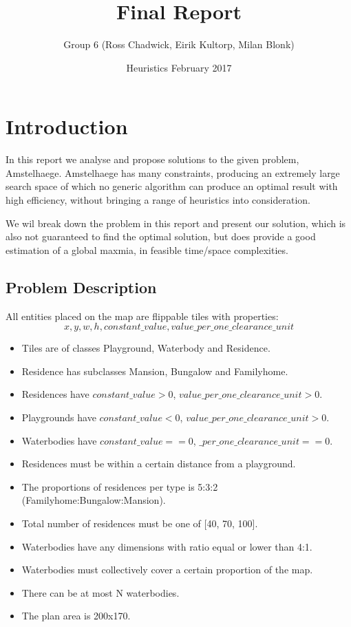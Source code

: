 \documentclass{article}
\title{Final Report}
\author{ Group 6 (Ross Chadwick, Eirik Kultorp, Milan Blonk) }
\date{Heuristics February 2017}
\begin{document}
\maketitle

\section{Introduction}

In this report we analyse and propose solutions to the given problem, Amstelhaege. Amstelhaege has many constraints, producing an extremely large search space of which no generic algorithm can produce an optimal result with high efficiency, without bringing a range of heuristics into consideration.

We wil break down the problem in this report and present our solution, which is also not guaranteed to find the optimal solution, but does provide a good estimation of a global maxmia, in feasible time/space complexities.

\subsection{Problem Description}

All entities placed on the map are flippable tiles with properties: \begin{equation}
{ x, y, w, h, constant\_value, value\_per\_one\_clearance\_unit }
\end{equation}

\begin{itemize}
\item Tiles are of classes Playground, Waterbody and Residence.
\item Residence has subclasses Mansion, Bungalow and Familyhome.
\item Residences have $constant\_value > 0$, $value\_per\_one\_clearance\_unit > 0$.
\item Playgrounds have $constant\_value < 0$, $value\_per\_one\_clearance\_unit > 0$.
\item Waterbodies have $constant\_value == 0$, $\_per\_one\_clearance\_unit == 0$.
\item Residences must be within a certain distance from a playground.
\item The proportions of residences per type is 5:3:2 (Familyhome:Bungalow:Mansion).
\item Total number of residences must be one of [40, 70, 100].
\item Waterbodies have any dimensions with ratio equal or lower than 4:1.
\item Waterbodies must collectively cover a certain proportion of the map.
\item There can be at most N waterbodies.
\item The plan area is 200x170.
\end{itemize}
\end{document}
